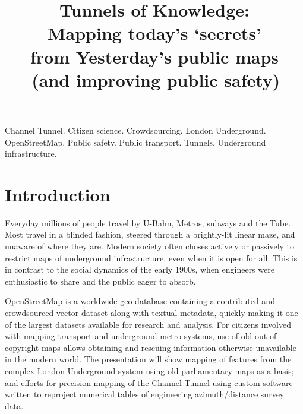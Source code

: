 \documentclass[conference,a4paper]{IEEEtran}
\begin{document}
\title{\hphantom{:}Tunnels of Knowledge:\\
\vspace{0.7em}
{\Large \hphantom{'}Mapping today's `secrets'\\\vspace{-0.6em} from Yesterday's public maps}\\
{\large *\,(and improving public safety)\hphantom{\,*}}}
\author{%
  \texorpdfstring{%
}{Paul Sladen}}
\maketitle

\begin{IEEEkeywords}
Channel Tunnel.
Citizen science.
Crowdsourcing.
London Underground.
OpenStreetMap.
Public safety.
Public transport.
Tunnels.
Underground infrastructure.
\end{IEEEkeywords}

\IEEEpeerreviewmaketitle

\section{Introduction}
Everyday millions of people travel by U-Bahn, Metros, subways and the
Tube. Most travel in a blinded fashion, steered through a brightly-lit
linear maze, and unaware of where they are. Modern society often
choses actively or passively to restrict maps of underground
infrastructure, even when it is open for all. This is in contrast to
the social dynamics of the early 1900s, when engineers were
enthusiastic to share and the public eager to absorb.

OpenStreetMap\cite{openstreetmap} is a worldwide geo-database containing a contributed and
crowdsourced vector dataset along with textual metadata, quickly making it one
of the largest datasets available for research and analysis.\cite{street-2006} For
citizens involved with mapping transport and underground metro
systems, use of old out-of-copyright maps allows obtaining and
rescuing information otherwise unavailable in the modern world. The
presentation will show mapping of features from the complex London
Underground system using old parliamentary maps as a basis; and
efforts for precision mapping of the Channel Tunnel using custom
software written to reproject numerical tables of engineering
azimuth/distance survey data.
\end{document}
